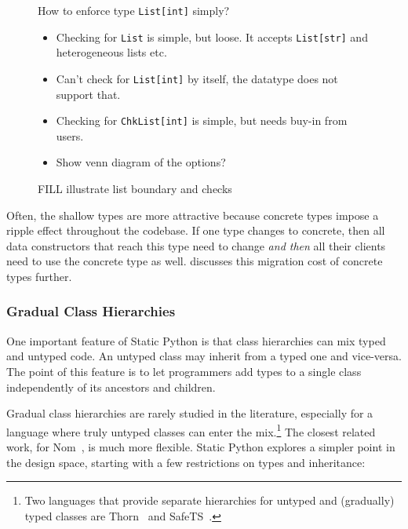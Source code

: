 \documentclass[english,cleveref,submission]{programming}
\newcommand{\SP}{Static Python}
\newcommand{\code}[1]{\texttt{#1}}
\begin{document}
\begin{figure}[t]
  How to enforce type \code{List[int]} simply?
  \begin{itemize}
    \item Checking for \code{List} is simple, but loose. It accepts \code{List[str]} and heterogeneous lists etc.
    \item Can't check for \code{List[int]} by itself, the datatype does not support that.
    \item Checking for \code{ChkList[int]} is simple, but needs buy-in from users.
    \item Show venn diagram of the options?
  \end{itemize}
  \caption{FILL illustrate list boundary and checks}
  \label{f:list-boundary}
\end{figure}

Often, the shallow types are more attractive because concrete types impose
a ripple effect throughout the codebase.
If one type changes to concrete, then all data constructors that reach this type need
to change \emph{and then} all their clients need to use the concrete type as well.
 discusses this migration cost of concrete types further.


\subsubsection{Gradual Class Hierarchies}
\label{s:inheritance}

One important feature of \SP{} is that class hierarchies can
mix typed and untyped code.
An untyped class may inherit from a typed one and vice-versa.
The point of this feature is to let programmers add types to a single class
independently of its ancestors and children.


Gradual class hierarchies are rarely studied in the literature, especially
for a language where truly untyped classes can enter the mix.\footnote{Two
languages that provide separate hierarchies for untyped and (gradually) typed
classes are Thorn~\cite{wzlov-popl-2010} and SafeTS~\cite{rsfbv-popl-2015}.}
The closest related work, for Nom~\cite{mt-oopsla-2017}, is much more flexible.
\SP{} explores a simpler point in the design space, starting with
a few restrictions on types and inheritance:
\end{document}
